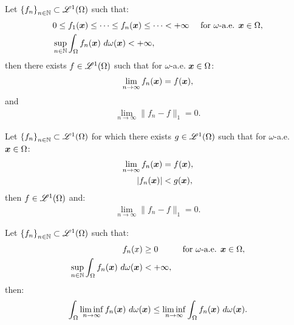 \begin{theorem}
    Let $\left\{ f_n \right\}_{n \in \mathbb{N}} \subset \mathscr{L}^{1}(\Omega)$ such that:
    \begin{align}
        & 0 \leq f_1(\bm{x}) \leq \dots \leq f_n(\bm{x}) \leq \dots < +\infty &\text{ for } \omega \text{-a.e. } \bm{x} \in \Omega, \\
        & \sup_{n \in \mathbb{N}} \int_\Omega f_n(\bm{x}) ~ d \omega(\bm{x}) < +\infty,
    \end{align}
    then there exists $f \in \mathscr{L}^{1}(\Omega)$ such that for $\omega$-a.e. $\bm{x} \in \Omega$:
    \begin{align}
        \lim_{n \rightarrow \infty} f_n(\bm{x}) = f(\bm{x}),
    \end{align}
    and
    \begin{align}
        \lim_{n \rightarrow \infty} \lVert f_n - f \rVert_1 = 0.
    \end{align}
\end{theorem}

\begin{theorem}
    Let $\left\{ f_n \right\}_{n \in \mathbb{N}} \subset \mathscr{L}^{1}(\Omega)$ for which there exists $g \in \mathscr{L}^{1}(\Omega)$ such that for $\omega$-a.e. $\bm{x} \in \Omega$:
    \begin{align}
        \lim_{n \rightarrow \infty} f_n(\bm{x}) & = f(\bm{x}), \\
        \lvert f_n(\bm{x}) \rvert & < g(\bm{x}),
    \end{align}
    then $f \in \mathscr{L}^{1}(\Omega)$ and:
    \begin{align}
        \lim_{n \rightarrow \infty} \lVert f_n - f \rVert_1 = 0.
    \end{align}
\end{theorem}

\begin{lemma}[Fatou]
    Let $\left\{ f_n \right\}_{n \in \mathbb{N}} \subset \mathscr{L}^{1}(\Omega)$ such that:
    \begin{align}
        f_n(x) & \geq 0 &\text{ for } \omega \text{-a.e. } \bm{x} \in \Omega, \\
        \sup_{n \in \mathbb{N}} \int_{\Omega} f_n(\bm{x}) ~ d \omega(\bm{x}) & < +\infty,
    \end{align}
    then:
    \begin{align}
        \int_{\Omega} \liminf_{n \rightarrow \infty} f_n(\bm{x}) ~ d \omega(\bm{x}) \leq \liminf_{n \rightarrow \infty} \int_{\Omega} f_n(\bm{x}) ~ d \omega(\bm{x}).
    \end{align}
\end{lemma}

